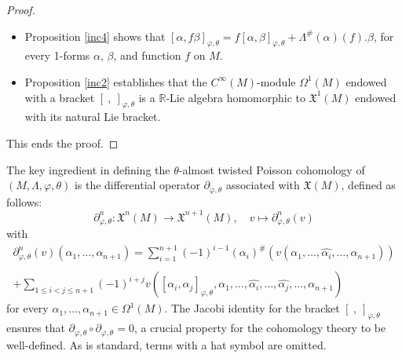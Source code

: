 \documentclass[a4paper,10pt]{article}
\numberwithin{equation}{section}
\theoremstyle{plain}
\begin{document}
\begin{proof}
\begin{itemize}
\begin{align*}
						 0&=i_{X}\Big([df,[dg,dh]_{\varphi,\theta}]_{\varphi,\theta}+[dg,[dh,df]_{\varphi,\theta}]_{\varphi,\theta}+[dh,[df,dg]_{\varphi,\theta}]_{\varphi,\theta} \Big) \\
						&\quad-d\varphi\big((df)^{\#},(dg)^{\#},(dh)^{\#},X\big)+\theta\wedge\varphi\big((df)^{\#},(dg)^{\#},(dh)^{\#},X\big)\\
						 &=i_{X}\Big([df,[dg,dh]_{\varphi,\theta}]_{\varphi,\theta}+[dg,[dh,df]_{\varphi,\theta}]_{\varphi,\theta}+[dh,[df,dg]_{\varphi,\theta}]_{\varphi,\theta} \Big).
					\end{align*}
					This prove the Jacobi identity of $[\ ,\ ]_{\varphi,\theta}$.
					\item  Proposition \ref{inc4} shows  that  $[\alpha,f\beta]_{\varphi,\theta}=f[\alpha,\beta]_{\varphi,\theta}+\Lambda^{\#}(\alpha)(f).\beta $,
					for every  1-forms $\alpha$, $\beta$, and function $f$ on $M$.
					\item  Proposition \ref{inc2}  establishes  that the  $C^\infty(M)$-module $\Omega^1(M)$  endowed with a bracket $[\ ,\ ] _{\varphi,\theta}$
					is a  $\mathbb{R}$-Lie algebra homomorphic to  $\mathfrak{X}^1(M)$ endowed with its natural Lie bracket.
				\end{itemize}
				This ends the proof.
			\end{proof}



			The key ingredient in defining the $\theta$-almost twisted Poisson cohomology of $(M,\Lambda,\varphi,\theta)$ is the differential operator $\partial_{\varphi,\theta}$ associated with $\mathfrak{X}(M)$, defined as follows:
			$$
			\partial_{\varphi,\theta}^n:\mathfrak{X}^{n}(M) \longrightarrow  \mathfrak{X}^{n+1}(M), \quad v \longmapsto \partial_{\varphi,\theta}^n(v)
			$$
			with
			\begin{equation}\label{expi1}
				\begin{array}{r}
					\partial_{\varphi,\theta}^n(v)(\alpha_1,\dots,\alpha_{n+1}) = \sum_{i=1}^{n+1}(-1)^{i-1}(\alpha_i)^{\#}(v(\alpha_1,\dots,\widehat{\alpha_i},\dots,\alpha_{n+1}))\\  \\+ \sum_{1\leq i<j\leq n+1}(-1)^{i+j}v([\alpha_i,\alpha_j]_{\varphi,\theta},\alpha_1,\dots,\widehat{\alpha_i},\dots,\widehat{\alpha_j},\dots,\alpha_{n+1})
				\end{array}
			\end{equation}
			for every $\alpha_1,\dots,\alpha_{n+1}\in\Omega^1(M)$. The Jacobi identity for the bracket $[\ ,\ ]_{\varphi,\theta}$ ensures that $\partial_{\varphi,\theta} \circ \partial_{\varphi,\theta} = 0$, a crucial property for the cohomology theory to be well-defined. As is standard, terms with a hat symbol are omitted.
			
\end{document}
